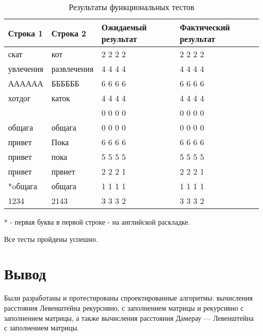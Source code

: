 \begin{table}[!ht]
  \caption{Результаты функциональных тестов}
  \centering
\begin{tabular}{ | l | l | l | l | }
\hline
Строка 1 & Строка 2 & Ожидаемый результат & Фактический результат \\ \hline
скат & кот & 2 2 2 2 & 2 2 2 2 \\
увлечения & развлечения & 4 4 4 4 & 4 4 4 4\\
АААААА & ББББББ & 6 6 6 6& 6 6 6 6\\
хотдог & каток & 4 4 4 4 & 4 4 4 4\\
 &  & 0 0 0 0 & 0 0 0 0\\
общага & общага & 0 0 0 0 & 0 0 0 0\\
привет & Пока & 6 6 6 6 & 6 6 6 6\\
привет & пока & 5 5 5 5 & 5 5 5 5 \\
привет & првиет & 2 2 2 1 & 2 2 2 1\\
*oбщага & общага & 1 1 1 1 & 1 1 1 1\\
1234 & 2143 & 3 3 3 2 & 3 3 3 2\\
\hline
\end{tabular}
\end{table}

* - первая буква в первой строке - на английской раскладке.

Все тесты пройдены успешно.

\section{Вывод}

Были разработаны и протестированы спроектированные алгоритмы: вычисления расстояния Левенштейна рекурсивно, с заполнением матрицы и рекурсивно с заполнением матрицы, а также вычисления расстояния Дамерау — Левенштейна с заполнением матрицы.
